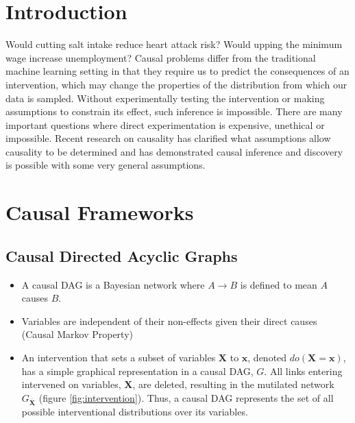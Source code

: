 \documentclass[a0,landscape,25pt,plainsections]{sciposter}
\begin{document}
\begin{multicols}{5} %




\section*{Introduction}

Would cutting salt intake reduce heart attack risk? Would upping the minimum wage increase unemployment? Causal problems differ from the traditional machine learning setting in that they require us to predict the consequences of an intervention, which may change the properties of the distribution from which our data is sampled. Without experimentally testing the intervention or making assumptions to constrain its effect, such inference is impossible. There are many important questions where direct experimentation is expensive, unethical or impossible. Recent research on causality has clarified what assumptions allow causality to be determined and has demonstrated causal inference and discovery is possible with some very general assumptions.   

\section*{Causal Frameworks}
\subsection*{Causal Directed Acyclic Graphs}
\begin{itemize}
\item A causal DAG is a Bayesian network where $A \rightarrow B$ is defined to mean $A$ causes $B$.
\item Variables are independent of their non-effects given their direct causes (Causal Markov Property)
\item An intervention that sets a subset of variables $\boldsymbol{X}$ to $\boldsymbol{x}$, denoted $do(\boldsymbol{X} = \boldsymbol{x})$, has a simple graphical representation in a causal DAG, $G$. All links entering intervened on variables, $\boldsymbol{X}$, are deleted, resulting in the mutilated network $G_{\overline{\boldsymbol{X}}}$ (figure \ref{fig:intervention}). Thus, a causal DAG represents the set of all possible interventional distributions over its variables.
\end{itemize}


\end{multicols}
\end{document}
